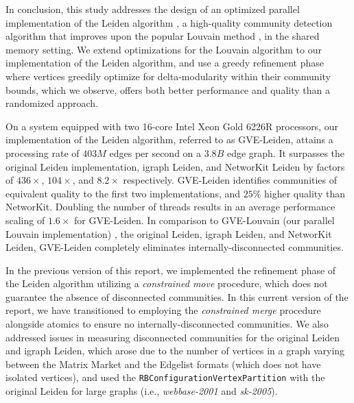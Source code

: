 In conclusion, this study addresses the design of an optimized parallel implementation of the Leiden algorithm \cite{com-traag19}, a high-quality community detection algorithm that improves upon the popular Louvain method \cite{com-blondel08}, in the shared memory setting. We extend optimizations for the Louvain algorithm \cite{sahu2023gvelouvain} to our implementation of the Leiden algorithm, and use a greedy refinement phase where vertices greedily optimize for delta-modularity within their community bounds, which we observe, offers both better performance and quality than a randomized approach.

On a system equipped with two 16-core Intel Xeon Gold 6226R processors, our implementation of the Leiden algorithm, referred to as GVE-Leiden, attains a processing rate of $403 M$ edges per second on a $3.8 B$ edge graph. It surpasses the original Leiden implementation, igraph Leiden, and NetworKit Leiden by factors of $436\times$, $104\times$, and $8.2\times$ respectively. GVE-Leiden identifies communities of equivalent quality to the first two implementations, and $25\%$ higher quality than NetworKit. Doubling the number of threads results in an average performance scaling of $1.6\times$ for GVE-Leiden. In comparison to GVE-Louvain (our parallel Louvain implementation) \cite{sahu2023gvelouvain}, the original Leiden, igraph Leiden, and NetworKit Leiden, GVE-Leiden completely eliminates internally-disconnected communities.

In the previous version of this report, we implemented the refinement phase of the Leiden algorithm utilizing a \textit{constrained move} procedure, which does not guarantee the absence of disconnected communities. In this current version of the report, we have transitioned to employing the \textit{constrained merge} procedure alongside atomics to ensure no internally-disconnected communities. We also addressed issues in measuring disconnected communities for the original Leiden and igraph Leiden, which arose due to the number of vertices in a graph varying between the Matrix Market and the Edgelist formats (which does not have isolated vertices), and used the \texttt{RBConfigurationVertexPartition} with the original Leiden for large graphs (i.e., \textit{webbase-2001} and \textit{sk-2005}).
